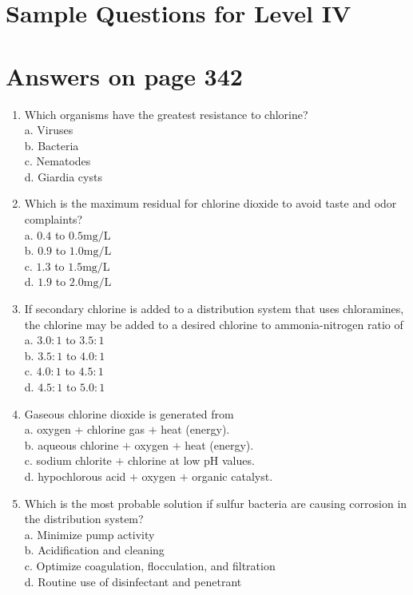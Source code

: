 \documentclass[10pt]{article}
\begin{document}
\section{Sample Questions for Level IV}
\section{Answers on page 342}
\begin{enumerate}
  \item Which organisms have the greatest resistance to chlorine?\\
a. Viruses\\
b. Bacteria\\
c. Nematodes\\
d. Giardia cysts

  \item Which is the maximum residual for chlorine dioxide to avoid taste and odor complaints?\\
a. $0.4$ to $0.5 \mathrm{mg} / \mathrm{L}$\\
b. $0.9$ to $1.0 \mathrm{mg} / \mathrm{L}$\\
c. $1.3$ to $1.5 \mathrm{mg} / \mathrm{L}$\\
d. $1.9$ to $2.0 \mathrm{mg} / \mathrm{L}$

  \item If secondary chlorine is added to a distribution system that uses chloramines, the chlorine may be added to a desired chlorine to ammonia-nitrogen ratio of\\
a. $3.0: 1$ to $3.5: 1$\\
b. $3.5: 1$ to $4.0: 1$\\
c. $4.0: 1$ to $4.5: 1$\\
d. $4.5: 1$ to $5.0: 1$

  \item Gaseous chlorine dioxide is generated from\\
a. oxygen + chlorine gas $+$ heat (energy).\\
b. aqueous chlorine $+$ oxygen $+$ heat (energy).\\
c. sodium chlorite $+$ chlorine at low $\mathrm{pH}$ values.\\
d. hypochlorous acid $+$ oxygen $+$ organic catalyst.

  \item Which is the most probable solution if sulfur bacteria are causing corrosion in the distribution system?\\
a. Minimize pump activity\\
b. Acidification and cleaning\\
c. Optimize coagulation, flocculation, and filtration\\
d. Routine use of disinfectant and penetrant

\end{enumerate}
\end{document}
